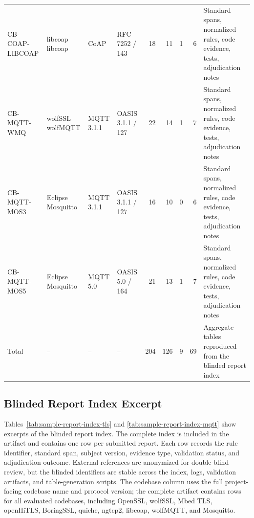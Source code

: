 \begin{table}[t]
\begin{tabular}{p{}p{}p{}p{}rrrrp{}}
CB-COAP-LIBCOAP & libcoap libcoap & CoAP & RFC 7252 / 143 & 18 & 11 & 1 & 6 & Standard spans, normalized rules, code evidence, tests, adjudication notes \\
CB-MQTT-WMQ & wolfSSL wolfMQTT & MQTT 3.1.1 & OASIS 3.1.1 / 127 & 22 & 14 & 1 & 7 & Standard spans, normalized rules, code evidence, tests, adjudication notes \\
CB-MQTT-MOS3 & Eclipse Mosquitto & MQTT 3.1.1 & OASIS 3.1.1 / 127 & 16 & 10 & 0 & 6 & Standard spans, normalized rules, code evidence, tests, adjudication notes \\
CB-MQTT-MOS5 & Eclipse Mosquitto & MQTT 5.0 & OASIS 5.0 / 164 & 21 & 13 & 1 & 7 & Standard spans, normalized rules, code evidence, tests, adjudication notes \\
\midrule
Total & -- & -- & -- & 204 & 126 & 9 & 69 & Aggregate tables reproduced from the blinded report index \\
\bottomrule
\end{tabular}
\end{table}

\subsection{Blinded Report Index Excerpt}

Tables~\ref{tab:sample-report-index-tls} and
\ref{tab:sample-report-index-mqtt} show excerpts of the blinded report index.
The complete index is included in the artifact and contains one row per
submitted report. Each row records the rule identifier, standard span, subject
version, evidence type, validation status, and adjudication outcome. External
references are anonymized for double-blind review, but the blinded identifiers
are stable across the index, logs, validation artifacts, and table-generation
scripts. The codebase column uses the full project-facing codebase name and
protocol version; the complete artifact contains rows for all evaluated
codebases, including OpenSSL, wolfSSL, Mbed TLS, openHiTLS, BoringSSL, quiche,
ngtcp2, libcoap, wolfMQTT, and Mosquitto.

